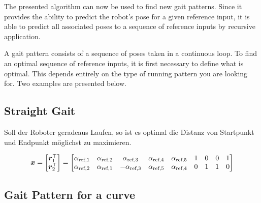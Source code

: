 \documentclass[10pt,a4paper]{article}
\begin{document}
%

The presented algorithm can now be used to find new gait patterns.
Since it provides the ability to predict the robot's pose for a given reference input, it is able to predict all associated poses to a sequence of reference inputs by recursive application.

A gait pattern consists of a sequence of poses taken in a continuous loop.
To find an optimal sequence of reference inputs, it is first necessary to define what is optimal.
This depends entirely on the type of running pattern you are looking for. 
Two examples are presented below.

\subsection{Straight Gait}

Soll der Roboter geradeaus Laufen, so ist es optimal die Distanz von Startpunkt und Endpunkt möglichst zu maximieren.

\begin{equation}
\bm{x} = \begin{bmatrix}
\bm{r}_1^\top \\ \bm{r}_2^\top
\end{bmatrix}
=
\begin{bmatrix}
\alpha_{\textnormal{ref},1}& \alpha_{\textnormal{ref},2}&\alpha_{\textnormal{ref},3}&\alpha_{\textnormal{ref},4}&\alpha_{\textnormal{ref},5}&1&0&0&1 \\
\alpha_{\textnormal{ref},2}& \alpha_{\textnormal{ref},1}&-\alpha_{\textnormal{ref},3}&\alpha_{\textnormal{ref},5}&\alpha_{\textnormal{ref},4}&0&1&1&0 \\
\end{bmatrix}
\end{equation}


\subsection{Gait Pattern for a curve}
\end{document}
